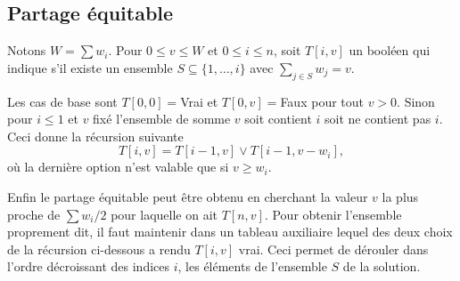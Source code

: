 \documentclass[12pt]{article}
\begin{document}
\subsection{Partage équitable}

Notons $W=\sum w_i$.  Pour $0\leq v \leq W$ et $0 \leq i \leq n$, soit $T[i,v]$ un booléen qui indique s'il existe un ensemble $S\subseteq \{1, \ldots, i\}$ avec $\sum_{j\in S} w_j = v$.

Les cas de base sont $T[0,0]=$Vrai et $T[0,v]=$Faux pour tout $v>0$.
Sinon pour $i \leq 1$ et $v$ fixé l'ensemble de somme $v$ soit contient $i$ soit ne contient pas $i$.  Ceci donne la récursion suivante
\[
		T[i,v] = T[i-1, v] \vee T[i-1, v - w_i],
\]
où la dernière option n'est valable que si $v \geq w_i$.

Enfin le partage équitable peut être obtenu en cherchant la valeur $v$ la plus proche de $\sum w_i /2$ pour laquelle on ait $T[n,v]$.  Pour obtenir l'ensemble proprement dit, il faut maintenir dans un tableau auxiliaire lequel des deux choix de la récursion ci-dessous a rendu $T[i,v]$ vrai. Ceci permet de dérouler dans l'ordre décroissant des indices $i$, les éléments de l'ensemble $S$ de la solution.
\end{document}
